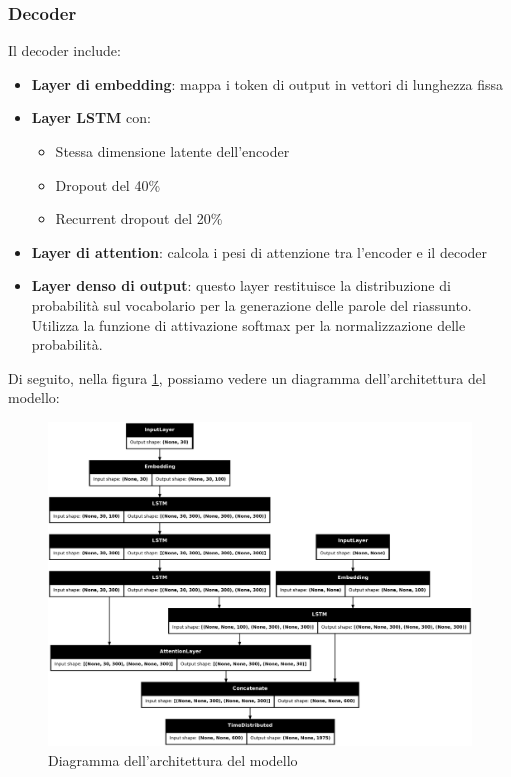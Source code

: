 \documentclass[a4paper, 12pt]{article}
\begin{document}
\subsubsection{Decoder}
Il decoder include:
\begin{itemize}
    \item \textbf{Layer di embedding}: mappa i token di output in vettori di lunghezza fissa
    \item \textbf{Layer LSTM} con:
        \begin{itemize}
            \item Stessa dimensione latente dell'encoder
            \item Dropout del 40\%
            \item Recurrent dropout del 20\%
        \end{itemize}
    \item \textbf{Layer di attention}: calcola i pesi di attenzione tra l'encoder e il decoder
    \item \textbf{Layer denso di output}: questo layer restituisce la distribuzione di probabilità sul vocabolario per la generazione delle parole del riassunto.\\ 
    Utilizza la funzione di attivazione softmax per la normalizzazione delle probabilità.
\end{itemize}

Di seguito, nella figura \ref{fig:model_architecture}, possiamo vedere un diagramma dell'architettura del modello:
\begin{figure}[H]
    \centering
    \includegraphics[width=1\textwidth]{media/Seq2SeqLSTM_originale_image.png}
    \caption{Diagramma dell'architettura del modello}
    \label{fig:model_architecture}
\end{figure}
\end{document}

